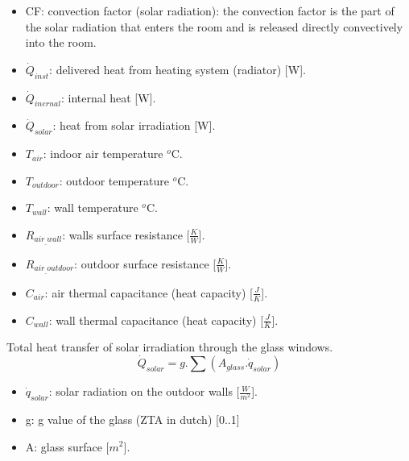  \begin{itemize}
      \item CF: convection factor (solar radiation): the convection factor is the part of the solar radiation that enters the room and is released directly convectively into the room.
      \item $\dot{Q}_{inst}$: delivered heat from heating system (radiator) [W].
      \item $\dot{Q}_{inernal}$: internal heat [W].
      \item $\dot{Q}_{solar}$: heat from solar irradiation [W].
      \item $T_{air}$: indoor air temperature $^o$C.
      \item $T_{outdoor}$: outdoor temperature $^o$C.
      \item $T_{wall}$: wall temperature $^o$C.
      \item $R_{air_{\_}wall}$: walls surface resistance [$\frac{K}{W}$].
      \item $R_{air_{\_}outdoor}$: outdoor surface resistance [$\frac{K}{W}$].
      \item $C_{air}$: air thermal capacitance (heat capacity) [$\frac{J}{K}$]\cite{Thermalmass}.
      \item $C_{wall}$: wall thermal capacitance (heat capacity) [$\frac{J}{K}$]\cite{Thermalmass}.
    \end{itemize}

\newpage   

Total heat transfer of solar irradiation through the glass windows. 
\begin{equation}
\dot{Q}_{solar}=g.\sum(A_{glass}.\dot{q}_{solar})
\end{equation}

\begin{itemize}
    \item $\dot{q}_{solar}$: solar radiation on the outdoor walls [$\frac{W}{m^2}$]. 
    \item g: g value of the glass (ZTA in dutch) [0..1]\cite{zontoetreding}
    \item A: glass surface [$m^2$].
\end{itemize}



\newpage
